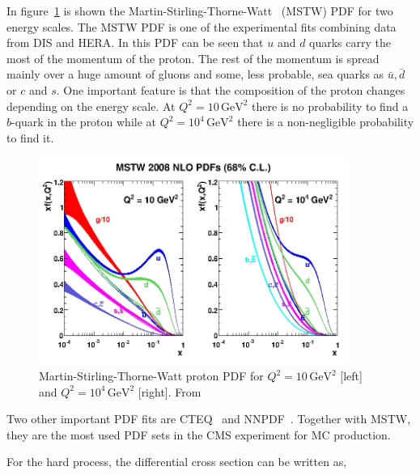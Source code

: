 In figure~\ref{fig:MSTW} is shown the Martin-Stirling-Thorne-Watt~\cite{Martin:2009iq} (MSTW) PDF for two energy scales. The MSTW PDF is one of the experimental fits combining data from DIS and HERA. In this PDF can be seen that $u$ and $d$ quarks carry the most of the momentum of the proton. The rest of the momentum is spread mainly over a huge amount of gluons and some, less probable, sea quarks as $\bar{u}, \bar{d}$ or $c$ and $s$. One important feature is that the composition of the proton changes depending on the energy scale. At $Q^{2}= 10\, \text{GeV}^{2}$ there is no probability to find a $b$-quark in the proton while at $Q^{2}= 10^{4}\, \text{GeV}^{2}$ there is a non-negligible probability to find it.

\begin{figure}[!Hhtbp]
  \begin{center}
    \includegraphics[width=0.9\textwidth]{figs/mstw2008nlo68cl_allpdfs.jpg}
    \caption{Martin-Stirling-Thorne-Watt proton PDF for $Q^{2}= 10\, \text{GeV}^{2}$ [left] and $Q^{2}= 10^{4}\, \text{GeV}^{2}$ [right]. From~\cite{Martin:2009iq}}
    \label{fig:MSTW}
  \end{center}
\end{figure}

Two other important PDF fits are CTEQ~\cite{Nadolsky:2008zw} and NNPDF~\cite{Ball:2010de}. Together with MSTW, they are the most used PDF sets in the CMS experiment for MC production. 

For the hard process, the differential cross section can be written as,

